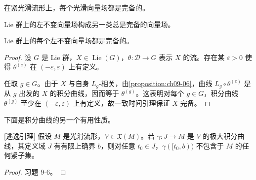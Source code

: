 \documentclass[../../main.tex]{subfiles}
\begin{document}
\begin{corollary}\label{corollary:ch09-17}
在紧光滑流形上，每个光滑向量场都是完备的。
\end{corollary}

Lie 群上的左不变向量场构成另一类总是完备的向量场。

\begin{theorem}\label{theorem:ch09-18}
Lie 群上的每个左不变向量场都是完备的。
\end{theorem}

\begin{proof}
设 $G$ 是 Lie 群，$X\in\operatorname{Lie}(G)$，$\theta\colon\mathscr{D}\to G$ 表示 $X$ 的流。存在某 $\varepsilon>0$ 使得 $\theta^{(e)}$ 在 $(-\varepsilon,\varepsilon)$ 上有定义。

任取 $g\in G$。由于 $X$ 与自身 $L_g$-相关，由\cref{proposition:ch09-06}，曲线 $L_g\circ\theta^{(e)}$ 是从 $g$ 出发的 $X$ 的积分曲线，因而等于 $\theta^{(g)}$。这表明对每个 $g\in G$，积分曲线 $\theta^{(g)}$ 至少在 $(-\varepsilon,\varepsilon)$ 上有定义，故一致时间引理保证 $X$ 完备。
\end{proof}

下面是积分曲线的另一个有用性质。

\begin{lemma}\label{lemma:ch09-19}[逃逸引理]
假设 $M$ 是光滑流形，$V\in\mathfrak{X}(M)$。若 $\gamma\colon J\to M$ 是 $V$ 的极大积分曲线，其定义域 $J$ 有有限上确界 $b$，则对任意 $t_0\in J$，$\gamma([t_0,b))$ 不包含于 $M$ 的任何紧子集。
\end{lemma}

\begin{proof}
习题 9-6。
\end{proof}
\end{document}
